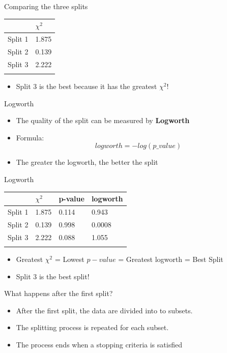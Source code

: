 \documentclass[
  ignorenonframetext,
]{beamer}
\providecommand{\tightlist}{%
  \setlength{\itemsep}{0pt}\setlength{\parskip}{0pt}}
\begin{document}
\begin{frame}{Comparing the three splits}
\label{comparing-the-three-splits}
\begin{longtable}[]{@{}ll@{}}
\toprule\noalign{}
& \(\chi^2\) \\
\midrule\noalign{}
\endhead
Split 1 & 1.875 \\
Split 2 & 0.139 \\
Split 3 & 2.222 \\
\bottomrule\noalign{}
\end{longtable}

\begin{itemize}
\tightlist
\item
  Split 3 is the best because it has the greatest \(\chi^2\)!
\end{itemize}
\end{frame}

\begin{frame}{Logworth}
\label{logworth}
\begin{itemize}
\tightlist
\item
  The quality of the split can be measured by \textbf{Logworth}
\item
  Formula: \[logworth = -log(p\text{_}value)\]
\item
  The greater the logworth, the better the split
\end{itemize}
\end{frame}

\begin{frame}{Logworth}
\label{logworth-1}
\begin{longtable}[]{@{}llll@{}}
\toprule\noalign{}
& \(\chi^2\) & p-value & logworth \\
\midrule\noalign{}
\endhead
Split 1 & 1.875 & 0.114 & 0.943 \\
Split 2 & 0.139 & 0.998 & 0.0008 \\
Split 3 & 2.222 & 0.088 & 1.055 \\
\bottomrule\noalign{}
\end{longtable}

\begin{itemize}
\item
  Greatest \(\chi^2\) = Lowest \(p-value\) = Greatest logworth = Best
  Split
\item
  Split 3 is the best split!
\end{itemize}
\end{frame}

\begin{frame}{What happens after the first split?}
\label{what-happens-after-the-first-split}
\begin{itemize}
\tightlist
\item
  After the first split, the data are divided into to subsets.
\item
  The splitting process is repeated for each subset.
\item
  The process ends when a stopping criteria is satisfied
\end{itemize}
\end{frame}
\end{document}
